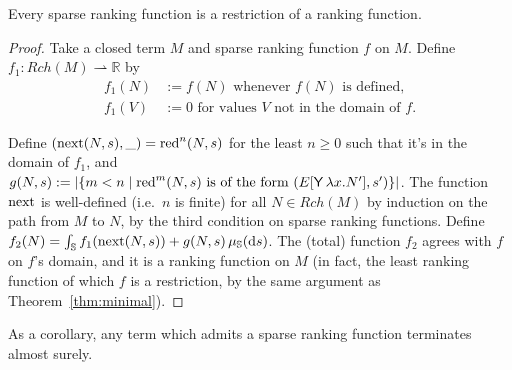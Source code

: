 \begin{therm}[Sparse function]
\label{thm:partial implies rankable}
Every sparse ranking function is a restriction of a ranking function.
\end{therm}

\begin{proof}
Take a closed term $M$ and sparse ranking function $f$ on $M$. Define $f_1 : Rch(M) \rightharpoonup \mathbb R$ by
\begin{align*}
    f_1(N) & := f(N) \text{ whenever $f(N)$ is defined,} \\
    f_1(V) & := 0 \text{ for values $V$ not in the domain of $f$.}
\end{align*}

Define $(\operatorname{next}(N,s),\_) = \operatorname{red}^n(N,s)$ for the least $n \geq 0$ such that it's in the domain of $f_1$, and $g(N,s) := \left | \{m < n \mid \operatorname{red}^m(N,s) \text{ is of the form } (E[\mathsf{Y}\, \lambda x. N'],s') \} \right |$. 
The function $\operatorname{next}$ is well-defined (i.e.~$n$ is finite) for all $N \in Rch(M)$ by induction on the path from $M$ to $N$, by the third condition on sparse ranking functions. Define $f_2(N) = \int_{\mathbb{S}} f_1(\operatorname{next}(N,s)) + g(N,s) \, \mu_{{\mathbb{S}}}(\mathrm d s)$. 
The (total) function $f_2$ agrees with $f$ on $f$'s domain, and it is a ranking function on $M$ (in fact, the least ranking function of which $f$ is a restriction, by the same argument as Theorem~\ref{thm:minimal}).
\end{proof}
As a corollary, any term which admits a sparse ranking function terminates almost surely.

